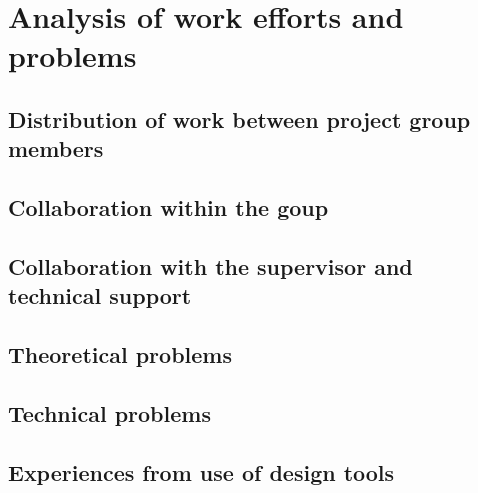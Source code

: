 \section{Analysis of work efforts and problems}
\subsection{Distribution of work between project group members}
\subsection{Collaboration within the goup}
\subsection{Collaboration with the supervisor and technical support}
\subsection{Theoretical problems}
\subsection{Technical problems}
\subsection{Experiences from use of design tools}